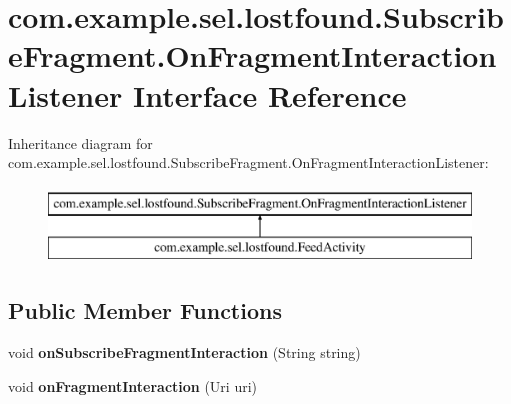 \hypertarget{interfacecom_1_1example_1_1sel_1_1lostfound_1_1SubscribeFragment_1_1OnFragmentInteractionListener}{}\section{com.\+example.\+sel.\+lostfound.\+Subscribe\+Fragment.\+On\+Fragment\+Interaction\+Listener Interface Reference}
\label{interfacecom_1_1example_1_1sel_1_1lostfound_1_1SubscribeFragment_1_1OnFragmentInteractionListener}
Inheritance diagram for com.\+example.\+sel.\+lostfound.\+Subscribe\+Fragment.\+On\+Fragment\+Interaction\+Listener\+:\begin{figure}[H]
\begin{center}
\leavevmode
\includegraphics[height=2.000000cm]{interfacecom_1_1example_1_1sel_1_1lostfound_1_1SubscribeFragment_1_1OnFragmentInteractionListener}
\end{center}
\end{figure}
\subsection*{Public Member Functions}
\begin{DoxyCompactItemize}
\item 
void {\bfseries on\+Subscribe\+Fragment\+Interaction} (String string)\hypertarget{interfacecom_1_1example_1_1sel_1_1lostfound_1_1SubscribeFragment_1_1OnFragmentInteractionListener_a49e52bf52ac045228eda481eaa5ad3a3}{}\label{interfacecom_1_1example_1_1sel_1_1lostfound_1_1SubscribeFragment_1_1OnFragmentInteractionListener_a49e52bf52ac045228eda481eaa5ad3a3}

\item 
void {\bfseries on\+Fragment\+Interaction} (Uri uri)\hypertarget{interfacecom_1_1example_1_1sel_1_1lostfound_1_1SubscribeFragment_1_1OnFragmentInteractionListener_a419de726f221023d20f573225984783b}{}\label{interfacecom_1_1example_1_1sel_1_1lostfound_1_1SubscribeFragment_1_1OnFragmentInteractionListener_a419de726f221023d20f573225984783b}

\end{DoxyCompactItemize}


